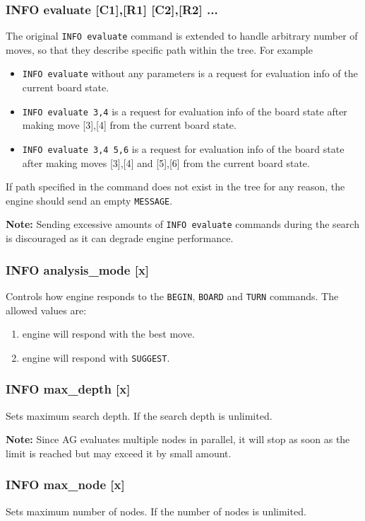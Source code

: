 \documentclass[12pt,a4paper]{article}
\begin{document}
\subsubsection{INFO evaluate [C1],[R1] [C2],[R2] ...}
The original \texttt{INFO evaluate} command is extended to handle arbitrary number of moves, so that they describe specific path within the tree. For example 
\begin{itemize}
\item{\texttt{INFO evaluate} without any parameters is a request for evaluation info of the current board state.}
\item{\texttt{INFO evaluate 3,4} is a request for evaluation info of the board state after making move [3],[4] from the current board state.}
\item{\texttt{INFO evaluate 3,4 5,6} is a request for evaluation info of the board state after making moves [3],[4] and [5],[6] from the current board state.}
\end{itemize}
If path specified in the command does not exist in the tree for any reason, the engine should send an empty \texttt{MESSAGE}.

\textbf{Note:} Sending excessive amounts of \texttt{INFO evaluate} commands during the search is discouraged as it can degrade engine performance.

\subsubsection{INFO analysis{\_}mode [x]}
Controls how engine responds to the \texttt{BEGIN}, \texttt{BOARD} and \texttt{TURN} commands. The allowed values are:
\begin{enumerate}[leftmargin=7.5em]
	\item[\text{$[x]=0$}]{engine will respond with the best move.}
	\item[\text{$[x]=1$}]{engine will respond with \texttt{SUGGEST}.}
\end{enumerate}

\subsubsection{INFO max{\_}depth [x]}
Sets maximum search depth. If  the search depth is unlimited.

\textbf{Note:} Since AG evaluates multiple nodes in parallel, it will stop as soon as the limit is reached but may exceed it by small amount.

\subsubsection{INFO max{\_}node [x]}
Sets maximum number of nodes. If  the number of nodes is unlimited.
\end{document}
